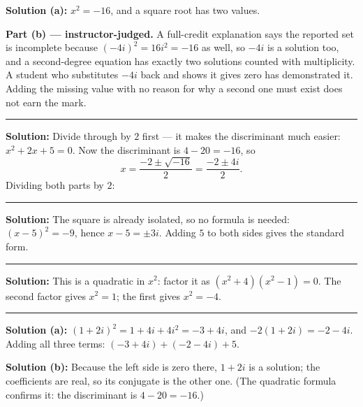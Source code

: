 \documentclass[12pt]{article}
\begin{document}
\textbf{Solution (a):} $x^{2} = -16$, and a square root has two values. 

\textbf{Part (b) --- instructor-judged.} A full-credit explanation says the
reported set is incomplete because $(-4i)^{2} = 16i^{2} = -16$ as well, so
$-4i$ is a solution too, and a second-degree equation has exactly two solutions
counted with multiplicity. A student who substitutes $-4i$ back and shows it
gives zero has demonstrated it. Adding the missing value with no reason for why
a second one must exist does not earn the mark.

\vspace{0.15cm}
\noindent\rule{\linewidth}{0.2pt}


\textbf{Solution:} Divide through by $2$ first --- it makes the discriminant
much easier: $x^{2} + 2x + 5 = 0$. Now the discriminant is
$4 - 20 = -16$, so
\[
  x = \frac{-2 \pm \sqrt{-16}}{2} = \frac{-2 \pm 4i}{2}.
\]
Dividing both parts by $2$: 

\vspace{0.15cm}
\noindent\rule{\linewidth}{0.2pt}


\textbf{Solution:} The square is already isolated, so no formula is needed:
$(x - 5)^{2} = -9$, hence $x - 5 = \pm 3i$. Adding $5$ to both sides gives the
standard form. 

\vspace{0.15cm}
\noindent\rule{\linewidth}{0.2pt}


\textbf{Solution:} This is a quadratic in $x^{2}$: factor it as
$(x^{2} + 4)(x^{2} - 1) = 0$. The second factor gives $x^{2} = 1$; the first
gives $x^{2} = -4$. 

\vspace{0.15cm}
\noindent\rule{\linewidth}{0.2pt}


\textbf{Solution (a):} $(1 + 2i)^{2} = 1 + 4i + 4i^{2} = -3 + 4i$, and
$-2(1 + 2i) = -2 - 4i$. Adding all three terms:
$(-3 + 4i) + (-2 - 4i) + 5$. 

\textbf{Solution (b):} Because the left side is zero there, $1 + 2i$ is a
solution; the coefficients are real, so its conjugate is the other one. (The
quadratic formula confirms it: the discriminant is $4 - 20 = -16$.) 
\end{document}
